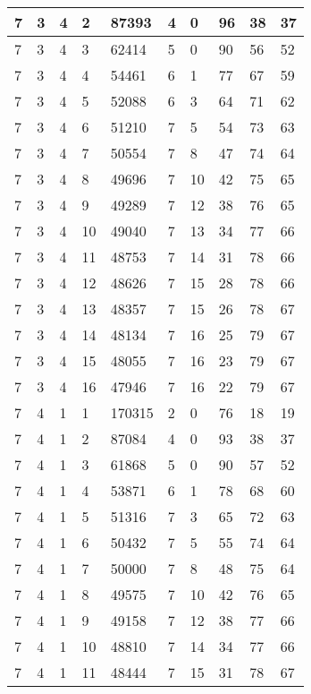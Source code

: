 \begin{table}[!ht]
\begin{tabular}{|l|l|l|l|l|l|l|l|l|l|}
        7 & 3 & 4 & 2 & 87393 & 4 & 0 & 96 & 38 & 37 \\ \hline
        7 & 3 & 4 & 3 & 62414 & 5 & 0 & 90 & 56 & 52 \\ \hline
        7 & 3 & 4 & 4 & 54461 & 6 & 1 & 77 & 67 & 59 \\ \hline
        7 & 3 & 4 & 5 & 52088 & 6 & 3 & 64 & 71 & 62 \\ \hline
        7 & 3 & 4 & 6 & 51210 & 7 & 5 & 54 & 73 & 63 \\ \hline
        7 & 3 & 4 & 7 & 50554 & 7 & 8 & 47 & 74 & 64 \\ \hline
        7 & 3 & 4 & 8 & 49696 & 7 & 10 & 42 & 75 & 65 \\ \hline
        7 & 3 & 4 & 9 & 49289 & 7 & 12 & 38 & 76 & 65 \\ \hline
        7 & 3 & 4 & 10 & 49040 & 7 & 13 & 34 & 77 & 66 \\ \hline
        7 & 3 & 4 & 11 & 48753 & 7 & 14 & 31 & 78 & 66 \\ \hline
        7 & 3 & 4 & 12 & 48626 & 7 & 15 & 28 & 78 & 66 \\ \hline
        7 & 3 & 4 & 13 & 48357 & 7 & 15 & 26 & 78 & 67 \\ \hline
        7 & 3 & 4 & 14 & 48134 & 7 & 16 & 25 & 79 & 67 \\ \hline
        7 & 3 & 4 & 15 & 48055 & 7 & 16 & 23 & 79 & 67 \\ \hline
        7 & 3 & 4 & 16 & 47946 & 7 & 16 & 22 & 79 & 67 \\ \hline
        7 & 4 & 1 & 1 & 170315 & 2 & 0 & 76 & 18 & 19 \\ \hline
        7 & 4 & 1 & 2 & 87084 & 4 & 0 & 93 & 38 & 37 \\ \hline
        7 & 4 & 1 & 3 & 61868 & 5 & 0 & 90 & 57 & 52 \\ \hline
        7 & 4 & 1 & 4 & 53871 & 6 & 1 & 78 & 68 & 60 \\ \hline
        7 & 4 & 1 & 5 & 51316 & 7 & 3 & 65 & 72 & 63 \\ \hline
        7 & 4 & 1 & 6 & 50432 & 7 & 5 & 55 & 74 & 64 \\ \hline
        7 & 4 & 1 & 7 & 50000 & 7 & 8 & 48 & 75 & 64 \\ \hline
        7 & 4 & 1 & 8 & 49575 & 7 & 10 & 42 & 76 & 65 \\ \hline
        7 & 4 & 1 & 9 & 49158 & 7 & 12 & 38 & 77 & 66 \\ \hline
        7 & 4 & 1 & 10 & 48810 & 7 & 14 & 34 & 77 & 66 \\ \hline
        7 & 4 & 1 & 11 & 48444 & 7 & 15 & 31 & 78 & 67 \\ \hline

\end{tabular}
\end{table}
